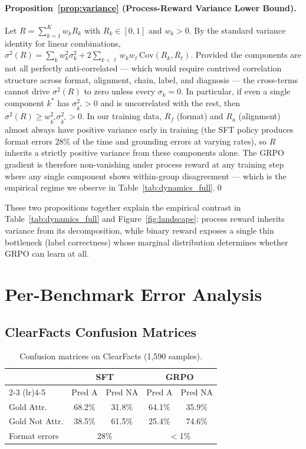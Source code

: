 \documentclass{article}
\begin{document}
\paragraph{Proposition~\ref{prop:variance} (Process-Reward Variance Lower Bound).}
Let $R = \sum_{k=1}^{K} w_k R_k$ with $R_k \in [0,1]$ and $w_k > 0$.
By the standard variance identity for linear combinations,
$\sigma^2(R) = \sum_k w_k^2 \sigma_k^2 + 2 \sum_{k < \ell} w_k w_\ell \,\mathrm{Cov}(R_k, R_\ell)$.
Provided the components are not all perfectly anti-correlated --- which would require contrived correlation structure across format, alignment, chain, label, and diagnosis --- the cross-terms cannot drive $\sigma^2(R)$ to zero unless every $\sigma_k = 0$.
In particular, if even a single component $k^*$ has $\sigma_{k^*}^2 > 0$ and is uncorrelated with the rest, then $\sigma^2(R) \geq w_{k^*}^2 \sigma_{k^*}^2 > 0$.
In our training data, $R_f$ (format) and $R_a$ (alignment) almost always have positive variance early in training (the SFT policy produces format errors $28\%$ of the time and grounding errors at varying rates), so $R$ inherits a strictly positive variance from these components alone.
The GRPO gradient is therefore non-vanishing under process reward at any training step where any single component shows within-group disagreement --- which is the empirical regime we observe in Table~\ref{tab:dynamics_full}.\qed

These two propositions together explain the empirical contrast in Table~\ref{tab:dynamics_full} and Figure~\ref{fig:landscape}: process reward inherits variance from its decomposition, while binary reward exposes a single thin bottleneck (label correctness) whose marginal distribution determines whether GRPO can learn at all.

\section{Per-Benchmark Error Analysis}
\label{app:error_analysis}

\subsection{ClearFacts Confusion Matrices}

\begin{table}[h]
\centering
\small
\caption{Confusion matrices on ClearFacts (1,590 samples).}
\label{tab:confusion_full}
\setlength{\tabcolsep}{4pt}
\begin{tabular}{lcccc}
\toprule
& \multicolumn{2}{c}{\textbf{SFT}} & \multicolumn{2}{c}{\textbf{GRPO}} \\
\cmidrule(lr){2-3} \cmidrule(lr){4-5}
& Pred A & Pred NA & Pred A & Pred NA \\
\midrule
Gold Attr. & 68.2\% & 31.8\% & 64.1\% & 35.9\% \\
Gold Not Attr. & 38.5\% & 61.5\% & 25.4\% & 74.6\% \\
\midrule
Format errors & \multicolumn{2}{c}{28\%} & \multicolumn{2}{c}{$<$1\%} \\
\bottomrule
\end{tabular}
\end{table}
\end{document}
